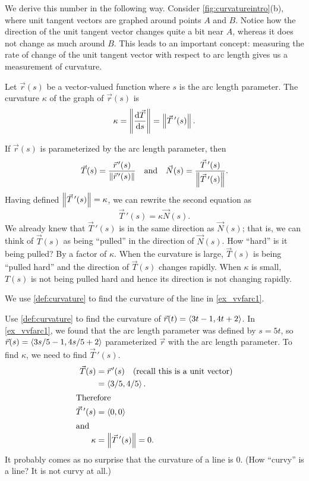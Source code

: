 We derive this number in the following way. Consider \autoref{fig:curvatureintro}(b), where  unit tangent vectors are graphed around points $A$ and $B$. Notice how the direction of the unit tangent vector changes quite a bit near $A$, whereas it does not change as much around $B$. This leads to an important concept: measuring the rate of change of the unit tangent vector with respect to arc length gives us a measurement of curvature.

\begin{definition}[Curvature]\label{def:curvature}%
Let $\vec r(s)$ be a vector-valued function where $s$ is the arc length parameter. The curvature $\kappa$ of the graph of $\vec r(s)$ is
\[\kappa = \left\lVert \frac{\operatorname{d}\!\vec T}{\operatorname{d}\! s} \right\rVert = \left\lVert \vec T\,'(s) \right\rVert.\]
\end{definition}

If $\vec r(s)$ is parameterized by the arc length parameter, then 
\[\vec T(s) = \frac{\vec r\hskip1.25pt '(s)}{\left\lVert \vec r\hskip1.25pt '(s) \right\rVert} \quad \text{and}\quad \vec N(s) = \frac{\vec T\,'(s)}{\left\lVert \vec T\,'(s) \right\rVert}.\]
Having defined $\left\lVert \vec T\,'(s) \right\rVert =\kappa$, we can rewrite the second equation as
\begin{equation}
\vec T\,'(s) = \kappa\vec N(s).\label{eq:curvature}
\end{equation}
We already knew that $\vec T\,'(s)$ is in the same direction as $\vec N(s)$; that is, we can think of $\vec T(s)$ as being ``pulled'' in the direction of $\vec N(s)$. How ``hard'' is it being pulled? By a factor of $\kappa$. When the curvature is large, $\vec T(s)$ is being ``pulled hard'' and the direction of $\vec T(s)$ changes rapidly. When $\kappa$ is small, $T(s)$ is not being pulled hard and hence its direction is not changing rapidly. 

We use \autoref{def:curvature} to find the curvature of the line in \autoref{ex_vvfarc1}.

\begin{example}\label{ex_curvature1}%
Use \autoref{def:curvature} to find the curvature of $\vec r(t) =\left\langle 3t-1,4t+2\right\rangle$.
\solution
In \autoref{ex_vvfarc1}, we found that the arc length parameter was defined by $s=5t$, so $\vec r(s) =\left\langle 3s/5-1, 4s/5+2\right\rangle$ parameterized $\vec r$ with the arc length parameter. To find $\kappa$, we need to find $\vec T\,'(s)$. 
\begin{align*}
\vec T(s) &= \vec r\hskip1.25pt '(s)\quad \text{(recall this is a unit vector)}\\
				&=\left\langle 3/5, 4/5\right\rangle.\\
\intertext{Therefore}
\vec T\,'(s) &=\left\langle 0,0\right\rangle\\
\intertext{and}
\kappa&=\left\lVert \vec T\,'(s) \right\rVert = 0.
\end{align*}
It probably comes as no surprise that the curvature of a line is 0. (How ``curvy\primeskip'' is a line? It is not curvy at all.)
\end{example}


